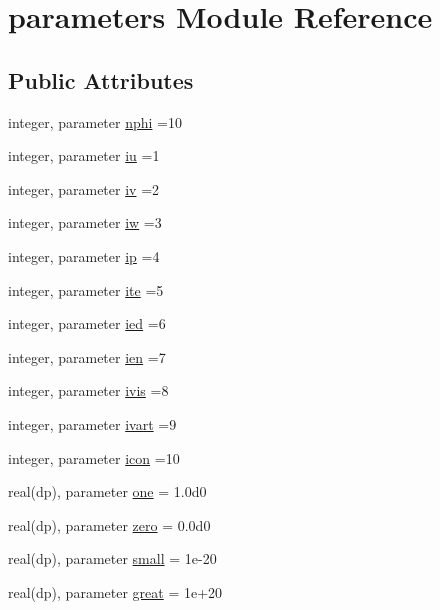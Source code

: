 \hypertarget{classparameters}{\section{parameters Module Reference}
\label{classparameters}
}
\subsection*{Public Attributes}
\begin{DoxyCompactItemize}
\item 
integer, parameter \hyperlink{classparameters_afdf22cfea1387cd3b96e7e05639e748e}{nphi} =10
\item 
integer, parameter \hyperlink{classparameters_a48e8a3b2787d19bee6b9c5f65f8cfb02}{iu} =1
\item 
integer, parameter \hyperlink{classparameters_ab4866f04b22e8c72f3f95e3f46b5d8ae}{iv} =2
\item 
integer, parameter \hyperlink{classparameters_adb764e48acf52e00f7be49f496487136}{iw} =3
\item 
integer, parameter \hyperlink{classparameters_a61bc7960e40d93539b7583a31b279611}{ip} =4
\item 
integer, parameter \hyperlink{classparameters_abd4387e202c0151aa8a34f5e3503ed0b}{ite} =5
\item 
integer, parameter \hyperlink{classparameters_ac77a69b8a24a91643db10d9f435aefa0}{ied} =6
\item 
integer, parameter \hyperlink{classparameters_a590abeddce862e6864b5fbe42c02859e}{ien} =7
\item 
integer, parameter \hyperlink{classparameters_a2c48c4814b16d64e233b7475c0007051}{ivis} =8
\item 
integer, parameter \hyperlink{classparameters_a16d579983b52d8fe11efc1c5374cc262}{ivart} =9
\item 
integer, parameter \hyperlink{classparameters_a328601eb15a83d809d9e1bfafe85411d}{icon} =10
\item 
real(dp), parameter \hyperlink{classparameters_ad200e8f8acd12afc12f7b019a982db1c}{one} = 1.\-0d0
\item 
real(dp), parameter \hyperlink{classparameters_a623b51a825739232a4efb904450ffe78}{zero} = 0.\-0d0
\item 
real(dp), parameter \hyperlink{classparameters_ad6b372045d519a445dc3962d56b6da22}{small} = 1e-\/20
\item 
real(dp), parameter \hyperlink{classparameters_a0661d83c6bd642cf4b90d65de20ada6d}{great} = 1e+20

\end{DoxyCompactItemize}
